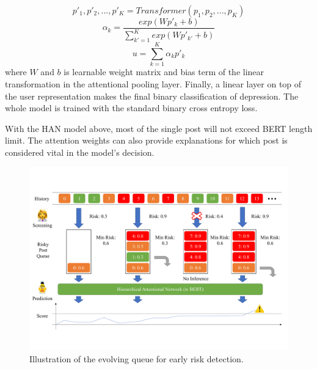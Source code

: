 \begin{equation}
    p'_1, p'_2, ..., p'_K = Transformer(p_1, p_2, ..., p_K)
\end{equation}
\begin{equation}
    \alpha_k = \frac{exp(W p'_k + b)}{\sum_{k'=1}^{K} exp(W p'_{k'} + b)}
\end{equation}
\begin{equation}
    u = \sum_{k=1}^K \alpha_k p'_k
\end{equation}
where $W$ and $b$ is learnable weight matrix and bias term of the linear transformation in the attentional pooling layer. Finally, a linear layer on top of the user representation makes the final binary classification of depression. The whole model is trained with the standard binary cross entropy loss.

With the HAN model above, most of the single post will not exceed BERT length limit. The attention weights can also provide explanations for which post is considered vital in the model's decision. %

\begin{figure}[htbp]
    \centering
    \includegraphics[width=1.5\columnwidth]{figures/evolving.pdf}
    \caption{Illustration of the evolving queue for early risk detection.}
    \label{fig:evolving}
\end{figure}

